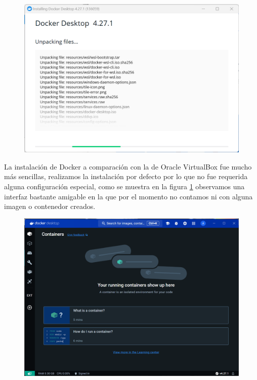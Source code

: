 \documentclass[12pt,a4paper]{article}
\begin{document}
\begin{figure}[H]
    \centering
    \includegraphics[width=1\linewidth]{M3_Virtualización_y_Contenedores/Tarea_3_Creación_Contenedor_Docker/reporte/figuras/2-1_Instalación_Docker.png}
    \label{fig:Instalación_Docker_1}
\end{figure}

La instalación de Docker a comparación con la de Oracle VirtualBox fue mucho más sencillas, realizamos la instalación por defecto por lo que no fue requerida alguna configuración especial, como se muestra en la figura \ref{fig:Instalación_Docker_1} observamos una interfaz bastante amigable en la que por el momento no contamos ni con alguna imagen o contenedor creados.

\begin{figure}[H]
    \centering
    \includegraphics[width=1\linewidth]{M3_Virtualización_y_Contenedores/Tarea_3_Creación_Contenedor_Docker/reporte/figuras/2-2_Instalación_Docker.png}
    \label{fig:Instalación_Docker_2}
\end{figure}
\end{document}
